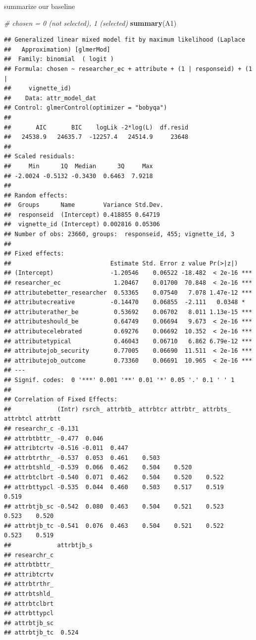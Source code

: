 \documentclass[
]{article}
\newenvironment{Shaded}{\begin{snugshade}}{\end{snugshade}}
\newcommand{\CommentTok}[1]{\textcolor[rgb]{0.56,0.35,0.01}{\textit{#1}}}
\newcommand{\FunctionTok}[1]{\textcolor[rgb]{0.13,0.29,0.53}{\textbf{#1}}}
\newcommand{\NormalTok}[1]{#1}
\begin{document}
summarize our baseline

\begin{Shaded}
\begin{Highlighting}[]
\CommentTok{\# chosen = 0 (not selected), 1 (selected)}
\FunctionTok{summary}\NormalTok{(A1)}
\end{Highlighting}
\end{Shaded}

\begin{verbatim}
## Generalized linear mixed model fit by maximum likelihood (Laplace
##   Approximation) [glmerMod]
##  Family: binomial  ( logit )
## Formula: chosen ~ researcher_ec + attribute + (1 | responseid) + (1 |  
##     vignette_id)
##    Data: attr_model_dat
## Control: glmerControl(optimizer = "bobyqa")
## 
##       AIC       BIC    logLik -2*log(L)  df.resid 
##   24538.9   24635.7  -12257.4   24514.9     23648 
## 
## Scaled residuals: 
##     Min      1Q  Median      3Q     Max 
## -2.0024 -0.5132 -0.3430  0.6463  7.9218 
## 
## Random effects:
##  Groups      Name        Variance Std.Dev.
##  responseid  (Intercept) 0.418855 0.64719 
##  vignette_id (Intercept) 0.002816 0.05306 
## Number of obs: 23660, groups:  responseid, 455; vignette_id, 3
## 
## Fixed effects:
##                            Estimate Std. Error z value Pr(>|z|)    
## (Intercept)                -1.20546    0.06522 -18.482  < 2e-16 ***
## researcher_ec               1.20467    0.01700  70.848  < 2e-16 ***
## attributebetter_researcher  0.53365    0.07540   7.078 1.47e-12 ***
## attributecreative          -0.14470    0.06855  -2.111   0.0348 *  
## attributerather_be          0.53692    0.06702   8.011 1.13e-15 ***
## attributeshould_be          0.64749    0.06694   9.673  < 2e-16 ***
## attributecelebrated         0.69276    0.06692  10.352  < 2e-16 ***
## attributetypical            0.46043    0.06710   6.862 6.79e-12 ***
## attributejob_security       0.77005    0.06690  11.511  < 2e-16 ***
## attributejob_outcome        0.73360    0.06691  10.965  < 2e-16 ***
## ---
## Signif. codes:  0 '***' 0.001 '**' 0.01 '*' 0.05 '.' 0.1 ' ' 1
## 
## Correlation of Fixed Effects:
##             (Intr) rsrch_ attrbtb_ attrbtcr attrbtr_ attrbts_ attrbtcl attrbtt
## researchr_c -0.131                                                            
## attrbtbttr_ -0.477  0.046                                                     
## attribtcrtv -0.516 -0.011  0.447                                              
## attrbtrthr_ -0.537  0.053  0.461    0.503                                     
## attrbtshld_ -0.539  0.066  0.462    0.504    0.520                            
## attrbtclbrt -0.540  0.071  0.462    0.504    0.520    0.522                   
## attrbttypcl -0.535  0.044  0.460    0.503    0.517    0.519    0.519          
## attrbtjb_sc -0.542  0.080  0.463    0.504    0.521    0.523    0.523    0.520 
## attrbtjb_tc -0.541  0.076  0.463    0.504    0.521    0.522    0.523    0.519 
##             attrbtjb_s
## researchr_c           
## attrbtbttr_           
## attribtcrtv           
## attrbtrthr_           
## attrbtshld_           
## attrbtclbrt           
## attrbttypcl           
## attrbtjb_sc           
## attrbtjb_tc  0.524
\end{verbatim}
\end{document}
